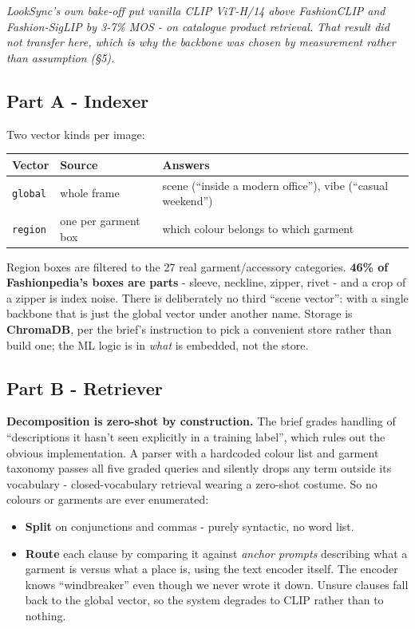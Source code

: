 \documentclass[10pt,a4paper]{article}
\begin{document}
{\small\itshape LookSync's own bake-off put vanilla CLIP ViT-H/14 above FashionCLIP and
Fashion-SigLIP by 3-7\% MOS - on catalogue product retrieval. That result did not
transfer here, which is why the backbone was chosen by measurement rather than
assumption (\S5).}

\subsection{Part A - Indexer}

Two vector kinds per image:

\begin{center}\small
\begin{tabular}{@{}lll@{}}
\toprule
\textbf{Vector} & \textbf{Source} & \textbf{Answers} \\
\midrule
\texttt{global} & whole frame & scene (``inside a modern office''), vibe (``casual weekend'') \\
\texttt{region} & one per garment box & which colour belongs to which garment \\
\bottomrule
\end{tabular}
\end{center}

Region boxes are filtered to the 27 real garment/accessory categories. \textbf{46\% of
Fashionpedia's boxes are parts} - sleeve, neckline, zipper, rivet - and a crop of a
zipper is index noise. There is deliberately no third ``scene vector'': with a single
backbone that is just the global vector under another name. Storage is \textbf{ChromaDB},
per the brief's instruction to pick a convenient store rather than build one; the ML
logic is in \emph{what} is embedded, not the store.

\subsection{Part B - Retriever}

\textbf{Decomposition is zero-shot by construction.} The brief grades handling of
``descriptions it hasn't seen explicitly in a training label'', which rules out the
obvious implementation. A parser with a hardcoded colour list and garment taxonomy
passes all five graded queries and silently drops any term outside its vocabulary -
closed-vocabulary retrieval wearing a zero-shot costume. So no colours or garments are
ever enumerated:

\begin{itemize}
  \item \textbf{Split} on conjunctions and commas - purely syntactic, no word list.
  \item \textbf{Route} each clause by comparing it against \emph{anchor prompts}
        describing what a garment is versus what a place is, using the text encoder
        itself. The encoder knows ``windbreaker'' even though we never wrote it down.
        Unsure clauses fall back to the global vector, so the system degrades to CLIP
        rather than to nothing.
\end{itemize}
\end{document}

